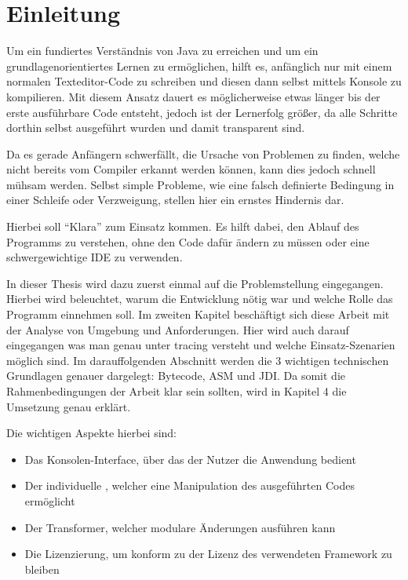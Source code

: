 
\chapter{Einleitung}

Um ein fundiertes Verständnis von Java zu erreichen und um ein grundlagenorientiertes Lernen zu ermöglichen, hilft es, anfänglich nur mit einem normalen Texteditor-Code zu schreiben und diesen dann selbst mittels Konsole zu kompilieren.
Mit diesem Ansatz dauert es möglicherweise etwas länger bis der erste ausführbare Code entsteht, jedoch ist der Lernerfolg größer, da alle Schritte dorthin selbst ausgeführt wurden und damit transparent sind.

Da es gerade Anfängern schwerfällt, die Ursache von Problemen zu finden, welche nicht bereits vom Compiler erkannt werden können, kann dies jedoch schnell mühsam werden. Selbst simple Probleme, wie eine falsch definierte Bedingung in einer Schleife oder Verzweigung, stellen hier ein ernstes Hindernis dar.

Hierbei soll "`Klara"' zum Einsatz kommen. Es hilft dabei, den Ablauf des Programms zu verstehen, ohne den Code dafür ändern zu müssen oder eine schwergewichtige \ac{IDE} zu verwenden.

In dieser Thesis wird dazu zuerst einmal auf die Problemstellung eingegangen. Hierbei wird beleuchtet, warum die Entwicklung nötig war und welche Rolle das Programm einnehmen soll.
Im zweiten Kapitel beschäftigt sich diese Arbeit mit der Analyse von Umgebung und Anforderungen. Hier wird auch darauf eingegangen was man genau unter tracing versteht und welche Einsatz-Szenarien möglich sind.
Im darauffolgenden Abschnitt werden die 3 wichtigen technischen Grundlagen genauer dargelegt: Bytecode, ASM und \ac{JDI}.
Da somit die Rahmenbedingungen der Arbeit klar sein sollten, wird in Kapitel 4 die Umsetzung genau erklärt.

Die wichtigen Aspekte hierbei sind:
\begin{itemize}
	\item Das Konsolen-Interface, über das der Nutzer die Anwendung bedient
	\item Der individuelle , welcher eine Manipulation des ausgeführten Codes ermöglicht
	\item Der Transformer, welcher modulare Änderungen ausführen kann
	\item Die Lizenzierung, um konform zu der Lizenz des verwendeten Framework zu bleiben
\end{itemize}

